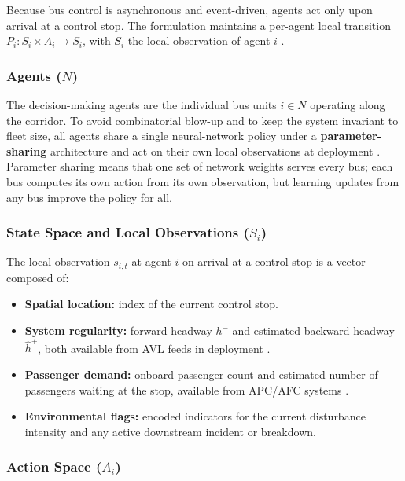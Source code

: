 Because bus control is asynchronous and event-driven, agents act only upon arrival at a control stop. The formulation maintains a per-agent local transition $P_i : S_i \times A_i \rightarrow S_i$, with $S_i$ the local observation of agent $i$ \cite{Wangsun,Rodriguez2023Cooperative}.

\subsubsection{Agents ($N$)}

The decision-making agents are the individual bus units $i \in N$ operating along the corridor. To avoid combinatorial blow-up and to keep the system invariant to fleet size, all agents share a single neural-network policy under a \textbf{parameter-sharing} architecture and act on their own local observations at deployment \cite{Wangsun,Rodriguez2023Cooperative,Christianos2021PS}. Parameter sharing means that one set of network weights serves every bus; each bus computes its own action from its own observation, but learning updates from any bus improve the policy for all.

\subsubsection{State Space and Local Observations ($S_i$)}
\label{subsec:state-space}

The local observation $s_{i,t}$ at agent $i$ on arrival at a control stop is a vector composed of:

\begin{itemize}
\item \textbf{Spatial location:} index of the current control stop.
\item \textbf{System regularity:} forward headway $h^-$ and estimated backward headway $\hat{h}^+$, both available from AVL feeds in deployment \cite{Wangsun}.
\item \textbf{Passenger demand:} onboard passenger count and estimated number of passengers waiting at the stop, available from APC/AFC systems \cite{Wangsun}.
\item \textbf{Environmental flags:} encoded indicators for the current disturbance intensity and any active downstream incident or breakdown.
\end{itemize}

\subsubsection{Action Space ($A_i$)}
\label{subsec:action-space}

